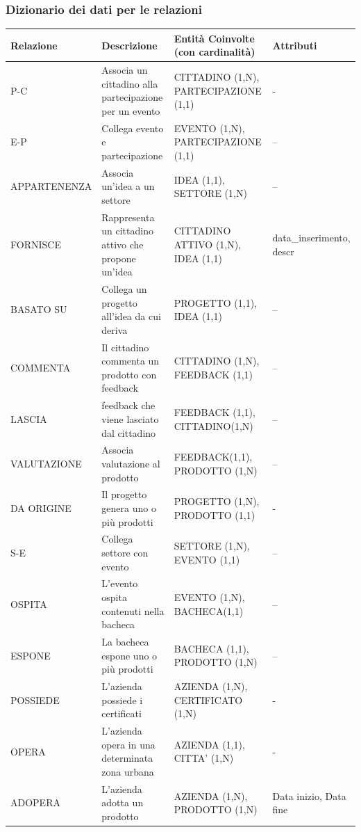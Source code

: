 \documentclass{article}
\begin{document}
\subsubsection{Dizionario dei dati per le relazioni}
\begin{table}[h!]
    \centering
    \begin{tabular}{|l|p{4cm}|p{6cm}|p{3cm}|}
    \hline
    \textbf{Relazione} & \textbf{Descrizione} & \textbf{Entità Coinvolte (con cardinalità)} & \textbf{Attributi} \\
    \hline
    P-C & Associa un cittadino alla partecipazione per un evento & CITTADINO (1,N), PARTECIPAZIONE (1,1) & - \\
    \hline
    E-P & Collega evento e partecipazione & EVENTO (1,N), PARTECIPAZIONE (1,1) & – \\
    \hline
    APPARTENENZA & Associa un'idea a un settore & IDEA (1,1), SETTORE (1,N) & – \\
    \hline
    FORNISCE & Rappresenta un cittadino attivo che propone un'idea & CITTADINO ATTIVO (1,N), IDEA (1,1) & data\_inserimento, descr \\
    \hline
    BASATO SU & Collega un progetto all’idea da cui deriva & PROGETTO (1,1), IDEA (1,1) & – \\
    \hline
    COMMENTA & Il cittadino commenta un prodotto con feedback & CITTADINO (1,N), FEEDBACK (1,1) & – \\
    \hline
    LASCIA & feedback che viene lasciato dal cittadino & FEEDBACK (1,1), CITTADINO(1,N) & – \\
    \hline
    VALUTAZIONE & Associa valutazione al prodotto & FEEDBACK(1,1), PRODOTTO (1,N) & – \\
    \hline
    DA ORIGINE & Il progetto genera uno o più prodotti & PROGETTO (1,N), PRODOTTO (1,1) & - \\
    \hline
    S-E & Collega settore con evento & SETTORE (1,N), EVENTO (1,1) & – \\
    \hline
    OSPITA & L'evento ospita contenuti nella bacheca & EVENTO (1,N), BACHECA(1,1) & – \\
    \hline
    ESPONE & La bacheca espone uno o più prodotti & BACHECA (1,1), PRODOTTO (1,N) & – \\
    \hline
    POSSIEDE & L'azienda possiede i certificati & AZIENDA (1,N), CERTIFICATO (1,N) & - \\
    \hline
    OPERA & L'azienda opera in una determinata zona urbana & AZIENDA (1,1), CITTA' (1,N) & - \\
    \hline
    ADOPERA & L'azienda adotta un prodotto & AZIENDA (1,N), PRODOTTO (1,N) & Data inizio, Data fine \\

\end{tabular}
\end{table}
\end{document}
